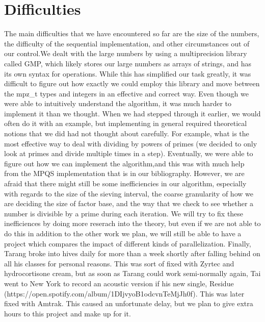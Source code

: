 \documentclass[11pt]{article}
\begin{document}
\section {Difficulties}
The main difficulties that we have encountered so far are the size of the numbers, the difficulty of the sequential implementation, and other circumstances out of our control.We dealt with the large numbers by using a multiprecision library called GMP, which likely stores our large numbers as arrays of strings, and has its own syntax for operations. While this has simplified our task greatly, it was difficult to figure out how exactly we could employ this library and move between the mpz_t types and integers in an effective and correct way. Even though we were able to intuitively understand the algorithm, it was much harder to implement it than we thought. When we had stepped through it earlier, we would often do it with an example, but implementing in general required theoretical notions that we did had not thought about carefully. For example, what is the most effective way to deal with dividing by powers of primes (we decided to only look at primes and divide multiple times in a step). Eventually, we were able to figure out how we can implement the algorithm,and this was with much help from the MPQS implementation that is in our bibliography. However, we are afraid that there might still be some inefficiencies in our algorithm, especially with regards to the size of the sieving interval, the coarse granularity of how we are deciding the size of factor base, and the way that we check to see whether a number is divisible by a prime during each iteration. We will try to fix these inefficiences by doing more reserach into the theory, but even if we are not able to do this in addition to the other work we plan, we will still be able to have a project which compares the impact of different kinds of parallelization. Finally, Tarang broke into hives daily for more than a week shortly after falling behind on all his classes for personal reasons. This was sort of fixed with Zyrtec and hydrocortisone cream, but as soon as Tarang could work semi-normally again, Tai went to New York to record an acoustic version if his new single, Residue (https://open.spotify.com/album/1DIjvyoB1odcvnTeMjJh0f). This was later fixed with Amtrak. This caused an unfortunate delay, but we plan to give extra hours to this project and make up for it. 
\end{document}
